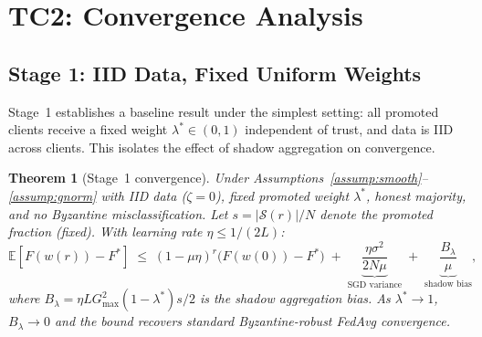 \documentclass{article}
\newtheorem{theorem}{Theorem}
\newcommand{\E}{\mathbb{E}}
\newcommand{\calS}{\mathcal{S}}
\begin{document}
\section{TC2: Convergence Analysis}
\label{sec:convergence}

\subsection{Stage 1: IID Data, Fixed Uniform Weights}
\label{sec:stage1}

Stage~1 establishes a baseline result under the simplest setting: all
promoted clients receive a fixed weight $\lambda^* \in (0,1)$ independent of
trust, and data is IID across clients.
This isolates the effect of shadow aggregation on convergence.

\begin{theorem}[Stage~1 convergence]
\label{thm:stage1}
Under Assumptions~\ref{assump:smooth}--\ref{assump:gnorm} with IID data
($\zeta = 0$), fixed promoted weight $\lambda^*$, honest majority, and no
Byzantine misclassification.
Let $s = |\calS(r)|/N$ denote the promoted fraction (fixed).
With learning rate $\eta \leq 1/(2L)$:
\[
  \E[F(w(r)) - F^*]
  \;\leq\;
  (1 - \mu\eta)^r\bigl(F(w(0)) - F^*\bigr)
  \;+\;
  \underbrace{\frac{\eta\sigma^2}{2N\mu}}_{\text{SGD variance}}
  \;+\;
  \underbrace{\frac{B_{\lambda}}{\mu}}_{\text{shadow bias}},
\]
where $B_{\lambda} = \eta L G_{\max}^2 (1-\lambda^*) s /2$ is the shadow
aggregation bias.
As $\lambda^* \to 1$, $B_\lambda \to 0$ and the bound recovers standard
Byzantine-robust FedAvg convergence.
\end{theorem}
\end{document}
